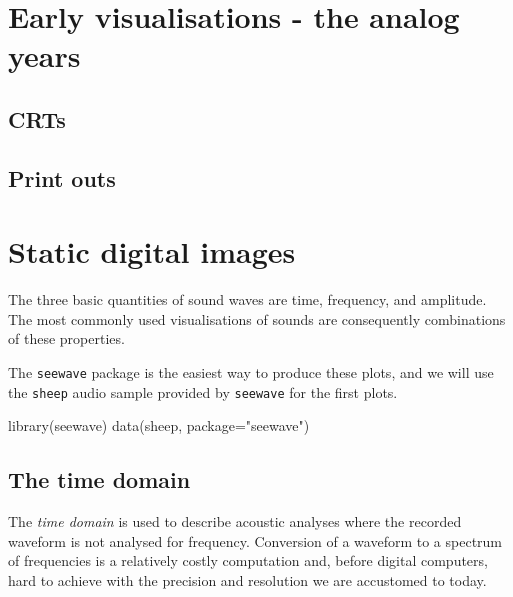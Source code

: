 \documentclass[
]{book}
\newenvironment{Shaded}{\begin{snugshade}}{\end{snugshade}}
\newcommand{\AttributeTok}[1]{\textcolor[rgb]{0.77,0.63,0.00}{#1}}
\newcommand{\FunctionTok}[1]{\textcolor[rgb]{0.00,0.00,0.00}{#1}}
\newcommand{\NormalTok}[1]{#1}
\newcommand{\StringTok}[1]{\textcolor[rgb]{0.31,0.60,0.02}{#1}}
\begin{document}
\hypertarget{early-viz}{%
\chapter{Early visualisations - the analog years}\label{early-viz}}

\hypertarget{crts}{%
\section{CRTs}\label{crts}}

\hypertarget{print-outs}{%
\section{Print outs}\label{print-outs}}

\hypertarget{static-digital-images}{%
\chapter{Static digital images}\label{static-digital-images}}

The three basic quantities of sound waves are time, frequency, and amplitude. The most commonly used visualisations of sounds are consequently combinations of these properties.

The \texttt{seewave} package \citep{seewave} is the easiest way to produce these plots, and we will use the \texttt{sheep} audio sample provided by \texttt{seewave} for the first plots.

\begin{Shaded}
\begin{Highlighting}[]
\FunctionTok{library}\NormalTok{(seewave)}
\FunctionTok{data}\NormalTok{(sheep, }\AttributeTok{package=}\StringTok{"seewave"}\NormalTok{)}
\end{Highlighting}
\end{Shaded}

\hypertarget{the-time-domain}{%
\section{The time domain}\label{the-time-domain}}

The \emph{time domain} is used to describe acoustic analyses where the recorded waveform is not analysed for frequency. Conversion of a waveform to a spectrum of frequencies is a relatively costly computation and, before digital computers, hard to achieve with the precision and resolution we are accustomed to today.
\end{document}
